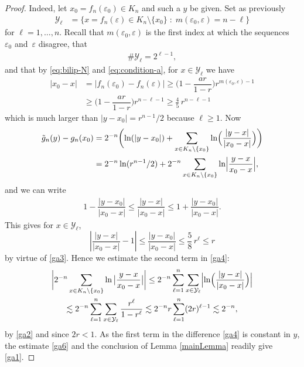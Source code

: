\documentclass[JEP,XML,SOM,Unicode,published]{cedram}
\numberwithin{equation}{section}
\theoremstyle{plain}
\theoremstyle{definition}
\newcommand{\cY}{{\mathcal Y}}
\begin{document}
\begin{proof}
Indeed, let $x_0 = f_n(\varepsilon_0) \in K_n$ and such a $y$ be given.
Set as previously
\begin{align*}
\cY_\ell & = \{ x = f_n(\varepsilon) \in K_n \setminus \{x_0\} \; : \; m(\varepsilon_0, \varepsilon) = n-\ell\} %
\end{align*}
for $\ell=1,\dots , n$.
Recall that $m(\varepsilon_0, \varepsilon)$ is the first index at which the sequences~$\varepsilon_0$ and~$\varepsilon$ disagree, that
\begin{align}
\# \cY_\ell = 2^{\ell-1}, \label{ga2}
\end{align}
and that by \eqref{eq:bilip-N} and \eqref{eq:condition-a}, for $x \in \cY_\ell$ we have
\begin{align} \label{ga3}
|x_0 - x| &= |f_n(\varepsilon_0) - f_n(\varepsilon)|
\ge \Big ( 1 - \dfrac{ar}{1-r} \Big )r^{m(\varepsilon_0, \varepsilon)-1}
\nonumber
\\ & \ge \Big ( 1 - \dfrac{ar}{1-r} \Big )r^{n-\ell-1}
\geq \frac45 \, r^{n-\ell-1}
\end{align}
which is much larger than $|y-x_0| = r^{n-1}/2$ because $\ell \geq 1$.
Now
\begin{equation}\label{ga4}
\begin{aligned}
\tilde{g}_n(y) - g_n(x_0) & = 2^{-n} \biggl( \ln(|y-x_0|) + \sum_{x \in K_n \setminus \{x_0\}} \ln \Bigl ( \dfrac{|y-x|}{|x_0-x|} \Bigr) \biggr) \\
& = 2^{-n} \ln(r^{n-1}/2) + 2^{-n}\sum_{x \in K_n \setminus \{x_0\}} \ln \Bigl |\dfrac{y-x}{x_0-x} \Bigr |,
\end{aligned}
\end{equation}
and we can write
\begin{align*}
1 - \dfrac{|y-x_0|}{|x_0-x|} \le \dfrac{\left |y-x \right |}{\left| x_0-x \right| }
\le 1 + \dfrac{|y-x_0|}{|x_0-x|}.
\end{align*}
This gives for $x \in \cY_\ell$,
\begin{equation}
\left | \dfrac{|y-x|}{|x_0-x|} -1 \right| \le \dfrac{|y-x_0|}{|x_0-x|}
\leq \frac58 \, r^{\ell} \leq r
\label{ga5}
\end{equation}
by virtue of \eqref{ga3}. Hence we estimate the second term in \eqref{ga4}:
\begin{multline} \label{ga6}
\biggl |2^{-n}\sum_{x \in K_n \setminus \{x_0\}}\ln \big|\dfrac{y-x}{x_0-x} \big | \biggr |
\le 2^{-n} \sum_{\ell =1}^n \sum_{x \in \cY_\ell }
\Bigl| \ln \Bigl( \dfrac{|y-x|}{|x_0-x|} \Bigr) \Bigr | \\
\lesssim 2^{-n} \sum_{\ell=1}^n \sum_{x \in \cY_\ell} \dfrac{ r^{\ell}}{1-r^{\ell}}
\lesssim 2^{-n}r \sum_{\ell=1}^n (2r)^{\ell-1}
\lesssim 2^{-n},
\end{multline}
by \eqref{ga2} and since $2r <1$. As the first term in the difference \eqref{ga4} is constant in $y$, the estimate \eqref{ga6} and the conclusion of Lemma \ref{mainLemma} readily give \eqref{ga1}.


\end{proof}
\end{document}

